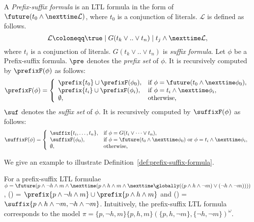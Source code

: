 \begin{definition}\label{def:prefix-suffix-formula}
    A {\em Prefix-suffix formula} is an LTL formula in the form of $\future(t_0 \land \nexttime \mathcal{L})$, where $t_0$ is a conjunction of literals.
    $\mathcal{L}$ is defined as follows.
    $$
    \mathcal{L} \coloneqq \true \mid G(t_k \lor .. \lor t_n) \mid t_j \land \nexttime \mathcal{L},
    $$
    where $t_i$ is a conjunction of literals.
    $G(t_k \lor .. \lor t_n)$ is {\em suffix formula}.
    Let $\phi$ be a Prefix-suffix formula.
    $\pre$ denotes the {\em prefix set} of $\phi$.
    It is recursively computed by $\prefixF(\phi)$ as follows:
    \begin{equation}
        \nonumber
        \prefixF(\phi) =
        \left\{
            \begin{array}{ll}
                \prefix{t_0} \cup \prefixF(\phi_0), & \text{if } \phi = \future(t_0 \land \nexttime \phi_0),\\ 
                \prefix{t_i} \cup \prefixF(\phi_i), & \text{if } \phi = t_i \land \nexttime \phi_i,\\
                \emptyset, & \text{otherwise,}

            \end{array}
        \right.
    \end{equation}
    $\suf$ denotes the {\em suffix set} of $\phi$.
    It is recursively computed by $\suffixF(\phi)$ as follows:
    \begin{equation}
        \nonumber
        \suffixF(\phi) =
        \left\{
            \begin{array}{ll}
                \suffix{t_i,\dots,t_n}, & \text{if } \phi = G(t_i \lor \dots \lor t_n),\\ 
                \suffixF(\phi_0), & \text{if } \phi = \future(t_0 \land \nexttime \phi_0) \text{ or } \phi = t_i \land \nexttime \phi_i,\\
                \emptyset, & \text{otherwise,}
            \end{array}
        \right.
    \end{equation}
\end{definition}

We give an example to illustrate Definition~\ref{def:prefix-suffix-formula}.
\begin{example}
    For a prefix-suffix LTL formulae $\phi = \future(p \land \lnot h \land m \land \nexttime (p \land h \land m \land \nexttime \globally((p \land h \land \lnot m) \lor (\lnot h \land \lnot m))))$, \prefixF(\phi) = $\prefix{p \land \lnot h \land m}\cup\prefix{ p \land h \land m}$ and \suffixF(\phi) = $\suffix{p \land h \land \lnot m,\lnot h \land \lnot m}$.
    Intuitively, the prefix-suffix LTL formula corresponds to the model $\pi = \{p,\lnot h,m\}\{p,h,m\}(\{p,h,\lnot m\},\{\lnot h,\lnot m\})^{\omega}$.
\end{example}
    
